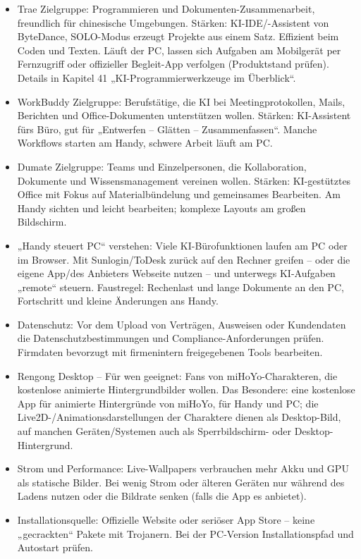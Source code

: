 \begin{itemize}
  \item Trae Zielgruppe: Programmieren und Dokumenten-Zusammenarbeit, freundlich für chinesische Umgebungen. Stärken: KI-IDE/-Assistent von ByteDance, SOLO-Modus erzeugt Projekte aus einem Satz. Effizient beim Coden und Texten. Läuft der PC, lassen sich Aufgaben am Mobilgerät per Fernzugriff oder offizieller Begleit-App verfolgen (Produktstand prüfen). Details in Kapitel 41 „KI-Programmierwerkzeuge im Überblick“.
  \item WorkBuddy Zielgruppe: Berufstätige, die KI bei Meetingprotokollen, Mails, Berichten und Office-Dokumenten unterstützen wollen. Stärken: KI-Assistent fürs Büro, gut für „Entwerfen – Glätten – Zusammenfassen“. Manche Workflows starten am Handy, schwere Arbeit läuft am PC.
  \item Dumate Zielgruppe: Teams und Einzelpersonen, die Kollaboration, Dokumente und Wissensmanagement vereinen wollen. Stärken: KI-gestütztes Office mit Fokus auf Materialbündelung und gemeinsames Bearbeiten. Am Handy sichten und leicht bearbeiten; komplexe Layouts am großen Bildschirm.
  \item „Handy steuert PC“ verstehen: Viele KI-Bürofunktionen laufen am PC oder im Browser. Mit Sunlogin/ToDesk zurück auf den Rechner greifen – oder die eigene App/des Anbieters Webseite nutzen – und unterwegs KI-Aufgaben „remote“ steuern. Faustregel: Rechenlast und lange Dokumente an den PC, Fortschritt und kleine Änderungen ans Handy.
  \item Datenschutz: Vor dem Upload von Verträgen, Ausweisen oder Kundendaten die Datenschutzbestimmungen und Compliance-Anforderungen prüfen. Firmdaten bevorzugt mit firmenintern freigegebenen Tools bearbeiten.
\end{itemize}


\begin{itemize}
  \item Rengong Desktop – Für wen geeignet: Fans von miHoYo-Charakteren, die kostenlose animierte Hintergrundbilder wollen. Das Besondere: eine kostenlose App für animierte Hintergründe von miHoYo, für Handy und PC; die Live2D-/Animationsdarstellungen der Charaktere dienen als Desktop-Bild, auf manchen Geräten/Systemen auch als Sperrbildschirm- oder Desktop-Hintergrund.
  \item Strom und Performance: Live-Wallpapers verbrauchen mehr Akku und GPU als statische Bilder. Bei wenig Strom oder älteren Geräten nur während des Ladens nutzen oder die Bildrate senken (falls die App es anbietet).
  \item Installationsquelle: Offizielle Website oder seriöser App Store – keine „gecrackten“ Pakete mit Trojanern. Bei der PC-Version Installationspfad und Autostart prüfen.
\end{itemize}

